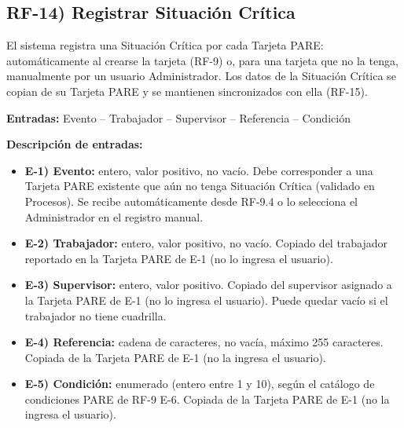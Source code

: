 \subsection*{RF-14) Registrar Situaci\'on Cr\'itica}
El sistema registra una Situaci\'on Cr\'itica por cada Tarjeta PARE: autom\'aticamente al crearse la tarjeta (RF-9) o, para una tarjeta que no la tenga, manualmente por un usuario Administrador. Los datos de la Situaci\'on Cr\'itica se copian de su Tarjeta PARE y se mantienen sincronizados con ella (RF-15).

\textbf{Entradas:} Evento -- Trabajador -- Supervisor -- Referencia -- Condici\'on

\textbf{Descripci\'on de entradas:}
\begin{itemize}[label={}, leftmargin=1.5em]
  \item \textbf{E-1) Evento:} entero, valor positivo, no vac\'io. Debe corresponder a una Tarjeta PARE existente que a\'un no tenga Situaci\'on Cr\'itica (validado en Procesos). Se recibe autom\'aticamente desde RF-9.4 o lo selecciona el Administrador en el registro manual.
  \item \textbf{E-2) Trabajador:} entero, valor positivo, no vac\'io. Copiado del trabajador reportado en la Tarjeta PARE de E-1 (no lo ingresa el usuario).
  \item \textbf{E-3) Supervisor:} entero, valor positivo. Copiado del supervisor asignado a la Tarjeta PARE de E-1 (no lo ingresa el usuario). Puede quedar vac\'io si el trabajador no tiene cuadrilla.
  \item \textbf{E-4) Referencia:} cadena de caracteres, no vac\'ia, m\'aximo 255 caracteres. Copiada de la Tarjeta PARE de E-1 (no la ingresa el usuario).
  \item \textbf{E-5) Condici\'on:} enumerado (entero entre 1 y 10), seg\'un el cat\'alogo de condiciones PARE de RF-9 E-6. Copiada de la Tarjeta PARE de E-1 (no la ingresa el usuario).
\end{itemize}

